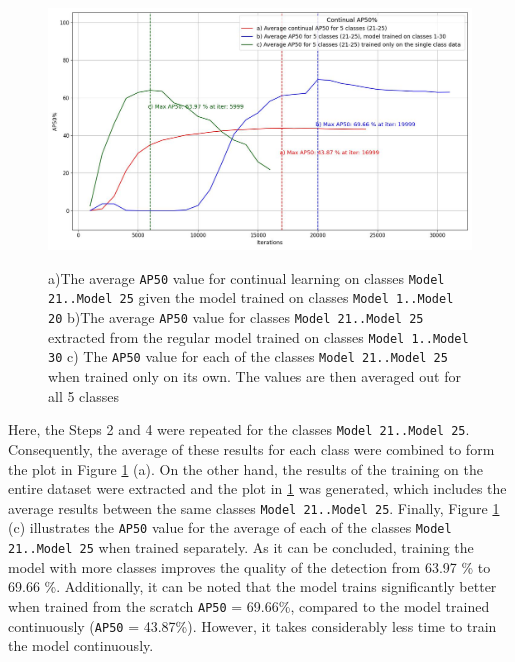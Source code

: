 \documentclass[english, 12pt, a4paper, elec, utf8, a-1b, online]{aaltothesis}
\begin{document}
\begin{figure}[htb]
	\begin{center}
		\includegraphics[width=14cm]{./continualAP_average.jpg}
	\end{center}
	\caption{a)The average \texttt{AP50} value for continual learning on classes \texttt{Model 21..Model 25} given the model trained on classes \texttt{Model 1..Model 20}  b)The average \texttt{AP50} value for classes \texttt{Model 21..Model 25} extracted from the regular model trained on classes \texttt{Model 1..Model 30} c) The \texttt{AP50} value for each of the classes \texttt{Model 21..Model 25} when trained only on its own. The values are then averaged out for all 5 classes }
	\begin{center}	\label{myModel_continuous_experiment_2}
	\end{center}
\end{figure}
\FloatBarrier
  
Here,  the Steps 2 and 4 were repeated for the classes \texttt{Model 21..Model 25}. Consequently, the average of these results for each class were combined to form the plot in Figure \ref{myModel_continuous_experiment_2} (a). On the other hand, the results of the training on the entire dataset were extracted and the plot in  \ref{myModel_continuous_experiment_2} was generated, which includes the average results between the same classes \texttt{Model 21..Model 25}. Finally, Figure \ref{myModel_continuous_experiment_2} (c) illustrates the \texttt{AP50} value for the average of each of the classes \texttt{Model 21..Model 25} when trained separately. As it can be concluded, training the model with more classes improves the quality of the detection from 63.97 \% to 69.66 \%. Additionally, it can be noted that the model trains significantly better when trained from the scratch \texttt{AP50} = 69.66\%, compared to the model trained continuously (\texttt{AP50} = 43.87\%). However, it takes considerably less time to train the model continuously.
\end{document}
